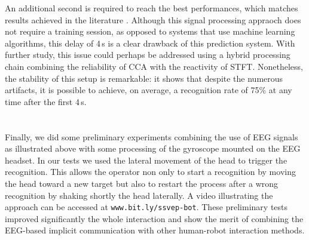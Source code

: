 \documentclass[smallextended]{svjour3}
\begin{document}
An additional second is required to reach the best performances, which matches results achieved in the literature \cite{Fan2015,SSVEPfiability,jian2014improving,paper4}. 
Although this signal processing appraoch does not require a training session, as opposed to systems that use machine learning algorithms, this delay of 4\,s is a clear drawback of this prediction system. 
With further study, this issue could perhaps be addressed using a hybrid processing chain combining the reliability of CCA with the reactivity of STFT.
Nonetheless, the stability of this setup is remarkable: it shows that despite the numerous artifacts, it is possible to achieve, on average, a recognition rate of 75\% at any time after the first 4\,s. \\
\\
\\
Finally, we did some preliminary experiments combining the use of EEG signals as illustrated above with some processing of the gyroscope mounted on the EEG headset. 
In our tests we used the lateral movement of the head to trigger the recognition. 
This allows the operator non only to start a recognition by moving the head toward a new target but also to restart the process after a wrong recognition by shaking shortly the head laterally. 
A video illustrating the approach can be accessed at \verb"www.bit.ly/ssvep-bot". 
These preliminary tests improved significantly the whole interaction and show the merit of combining the EEG-based implicit communication with other human-robot interaction methods.
\end{document}
